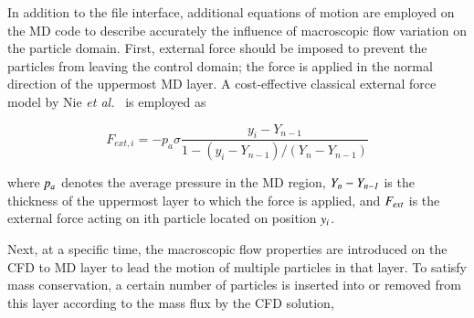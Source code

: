 \documentclass[preprint,12pt]{elsarticle}
\newcommand{\skonote}[1]{ {\textcolor{green} { ***Jeff: #1 }}}
\newcommand{\skonote}[1]{}
\begin{document}
In addition to the file interface, additional equations of motion are employed on the MD code to describe accurately the influence of macroscopic flow variation on the particle domain. First, external force should be imposed to prevent the particles from leaving the control domain; the force is applied in the normal direction of the uppermost MD layer. A cost-effective classical external force model by Nie {\it{et al.}}~\cite{Nie} is employed as


\vspace{-.2em}
\begin{equation}
 F_{ext, i} = -p_{a}\sigma\frac{y_{i}-Y_{n-1}}{1-(y_{i}-Y_{n-1})/(Y_{n}-Y_{n-1})}
 \label{eq:External_Force}
\end{equation}
\normalsize

where  $\it p_{a}$ denotes the average pressure in the MD region, $\it Y_{n}-Y_{n-1}$ is the thickness of the uppermost layer to which the force is applied, and $\it F_{ext}$ is the external force acting on ith particle located on position $\it y_{i}$.


Next, at a specific time, the macroscopic flow properties are introduced on the CFD to MD layer to lead the motion of multiple particles in that layer. To satisfy mass conservation, a certain number of particles is inserted into or removed from this layer according to the mass flux by the CFD solution,
\end{document}
